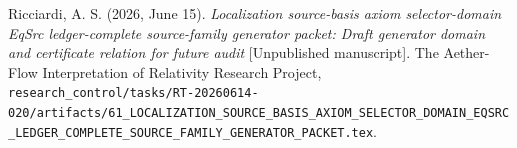 \documentclass[11pt]{article}
\begin{document}
Ricciardi, A. S. (2026, June 15). \emph{Localization source-basis axiom
selector-domain EqSrc ledger-complete source-family generator packet:
Draft generator domain and certificate relation for future audit}
[Unpublished manuscript]. The Aether-Flow Interpretation of Relativity
Research Project,
\texttt{research\_control/tasks/RT-20260614-020/artifacts/61\_LOCALIZATION\_SOURCE\_BASIS\_AXIOM\_SELECTOR\_DOMAIN\_EQSRC\_LEDGER\_COMPLETE\_SOURCE\_FAMILY\_GENERATOR\_PACKET.tex}.
\end{document}

